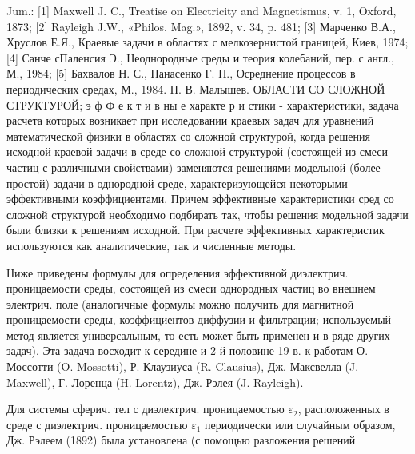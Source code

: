 \documentclass[10pt]{article}
\begin{document}
Jum.: [1] Maxwell J. C., Treatise on Electricity and Magnetismus, v. 1, Oxford, 1873; [2] Rayleigh J.W., «Philos. Mag.», 1892, v. 34, p. 481; [3] Марченко В.А., Хруслов Е.Я., Краевые задачи в областях с мелкозернистой границей, Киев, 1974; [4] Санче сПаленсия Э., Неоднородные среды и теория колебаний, пер. с англ., М., 1984; [5] Бахвалов Н. С., Панасенко Г. П., Осреднение процессов в периодических средах, М., 1984. П. В. Малышев. ОБЛАСТИ СО СЛОЖНОЙ СТРУКТУРОЙ; э ф Ф е к т и в ны е характе р и стики - характеристики, задача расчета которых возникает при исследовании краевых задач для уравнений математической физики в областях со сложной структурой, когда решения исходной краевой задачи в среде со сложной структурой (состоящей из смеси частиц с различными свойствами) заменяются решениями модельной (более простой) задачи в однородной среде, характеризующейся некоторыми эффективными коэффициентами. Причем эффективные характеристики сред со сложной структурой необходимо подбирать так, чтобы решения модельной задачи были близки к решениям исходной. При расчете эффективных характеристик используются как аналитические, так и численные методы.



Ниже приведены формулы для определения эффективной диэлектрич. проницаемости среды, состоящей из смеси однородных частиц во внешнем электрич. поле (аналогичные формулы можно получить для магнитной проницаемости среды, коэффициентов диффузии и фильтрации; используемый метод является универсальным, то есть может быть применен и в ряде других задач). Эта задача восходит к середине и 2-й половине 19 в. к работам О. Моссотти (O. Mossotti), Р. Клаузиуса (R. Clausius), Дж. Максвелла (J. Maxwell), Г. Лоренца (H. Lorentz), Дж. Рэлея (J. Rayleigh).



Для системы сферич. тел с диэлектрич. проницаемостью $\varepsilon_{2}$, расположенных в среде с диэлектрич. проницаемостью $\varepsilon_{1}$ периодически или случайным образом, Дж. Рэлеем (1892) была установлена (с помощью разложения решений
\end{document}
